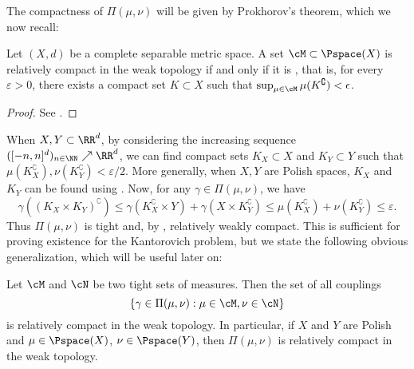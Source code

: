 \documentclass[oneside,reqno,letterpaper]{amsart}
\begin{document}
The compactness of \(\Pi(\mu, \nu)\) will be given by Prokhorov's theorem, which we now recall:
\begin{theorem}[Prokhorov]\label{prop:prokhorov}
  Let \((X, d)\) be a complete separable metric space.
  A set \(\cM \subset \Pspace(X)\) is relatively compact in the weak topology if and only if it is , that is, for every \(\varepsilon > 0\), there exists a compact set \(K \subset X\) such that \(\sup_{\mu \in \cM} \mu(K^\complement) < \epsilon\).
\end{theorem}
\begin{proof}
  See \cite[Theorem 7.9]{Zitkovic2013weak}.
\end{proof}

When \(X, Y \subset \RR^d\), by considering the increasing sequence \(([-n, n]^d)_{n \in \NN} \nearrow \RR^d\), we can find compact sets \(K_X \subset X\) and \(K_Y \subset Y\) such that \(\mu(K_X^\complement), \nu(K_Y^\complement) < \varepsilon / 2\).
More generally, when \(X, Y\) are Polish spaces, \(K_X\) and \(K_Y\) can be found using .
Now, for any \(\gamma \in \Pi(\mu, \nu)\), we have
\[
  \gamma\left( (K_X \times K_Y)^\complement \right)
  \leq \gamma(K_X^\complement \times Y) + \gamma(X \times K_Y^\complement)
  \leq \mu(K_X^\complement) + \nu(K_Y^\complement)
  \leq \varepsilon.
\]
Thus \(\Pi(\mu, \nu)\) is tight and, by , relatively weakly compact.
This is sufficient for proving existence for the Kantorovich problem, but we state the following obvious generalization, which will be useful later on:
\begin{proposition}\label{prop:couplings-of-tight-is-tight}
  Let \(\cM\) and \(\cN\) be two tight sets of measures.
  Then the set of all couplings
  \[
    \left\{\gamma \in \Pi(\mu, \nu) : \mu \in \cM, \nu \in \cN \right\}
  \]
  is relatively compact in the weak topology.
  In particular, if \(X\) and \(Y\) are Polish and \(\mu \in \Pspace(X)\), \(\nu \in \Pspace(Y)\), then \(\Pi(\mu, \nu)\) is relatively compact in the weak topology.
\end{proposition}
\end{document}
